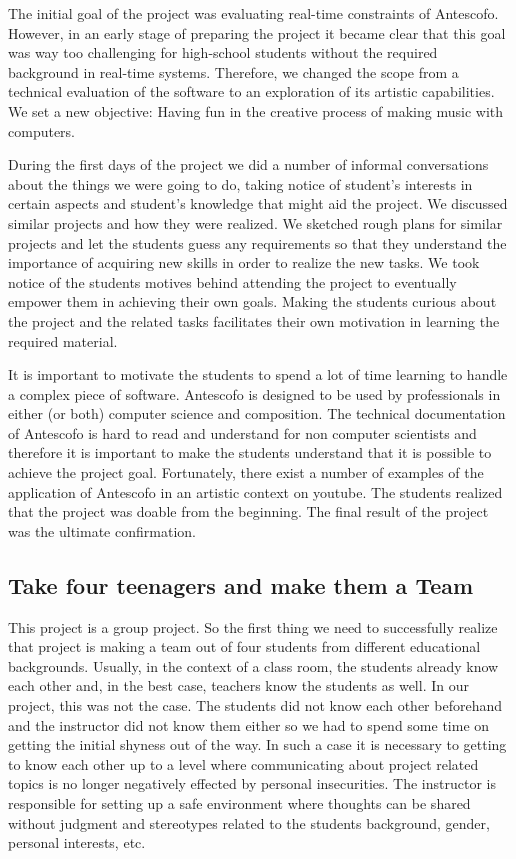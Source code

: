 \documentclass[onecolumn,nocopyrightspace,preprint]{sigplanconf}
\begin{document}
The initial goal of the project was evaluating real-time constraints of
Antescofo. However, in an early stage of preparing the project it became clear
that this goal was way too challenging for high-school students without the
required background in real-time systems. Therefore, we changed the scope from
a technical evaluation of the software to an exploration of its artistic
capabilities. We set a new objective: Having fun in the creative process of
making music with computers.

During the first days of the project we did a number of informal conversations
about the things we were going to do, taking notice of student's interests in
certain aspects and student's knowledge that might aid the project. We discussed
similar projects and how they were realized. We sketched rough plans for similar
projects and let the students guess any requirements so that they understand
the importance of acquiring new skills in order to realize the new tasks. We
took notice of the students motives behind attending the project to eventually
empower them in achieving their own goals. Making the students curious about the
project and the related tasks facilitates their own motivation in learning the
required material.

It is important to motivate the students to spend a lot of time learning to
handle a complex piece of software. Antescofo is designed to be used by
professionals in either (or both) computer science and composition. The
technical documentation of Antescofo is hard to read and understand for non
computer scientists and therefore it is important to make the students
understand that it is possible to achieve the project goal. Fortunately, there
exist a number of examples of the application of Antescofo in an artistic
context on youtube. The students realized that the project was doable from the
beginning. The final result of the project was the ultimate confirmation.

\subsection{Take four teenagers and make them a Team}\label{sec:team}

This project is a group project. So the first thing we need to successfully
realize that project is making a team out of four students from different
educational backgrounds. Usually, in the context of a class room, the students
already know each other and, in the best case, teachers know the students as
well. In our project, this was not the case. The students did not know each
other beforehand and the instructor did not know them either so we had to
spend some time on getting the initial shyness out of the way.
In such a case it is necessary to getting to know each other up to a level
where communicating about project related topics is no longer negatively
effected by personal insecurities. The instructor is responsible for setting
up a safe environment where thoughts can be shared without judgment and
stereotypes related to the students background, gender, personal interests, etc.
\end{document}
